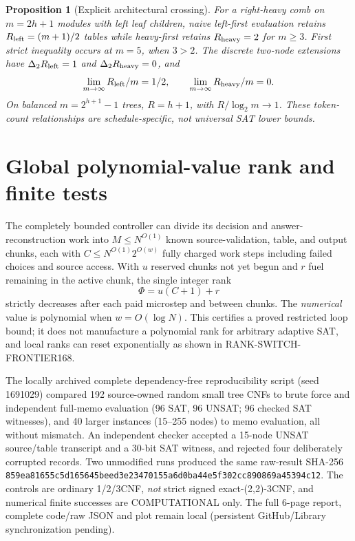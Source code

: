 \documentclass[11pt]{article}
\newtheorem{proposition}[theorem]{Proposition}
\begin{document}
\begin{proposition}[Explicit architectural crossing]
For a right-heavy comb on $m=2h+1$ modules with left leaf children, naive left-first evaluation retains $R_{\rm left}=(m+1)/2$ tables while heavy-first retains $R_{\rm heavy}=2$ for $m\ge3$. First strict inequality occurs at $m=5$, when $3>2$. The discrete two-node extensions have $\Delta_2 R_{\rm left}=1$ and $\Delta_2 R_{\rm heavy}=0$, and
\[
 \lim_{m\to\infty}R_{\rm left}/m=1/2,\qquad
 \lim_{m\to\infty}R_{\rm heavy}/m=0.
\]
On balanced $m=2^{h+1}-1$ trees, $R=h+1$, with $R/\log_2m\to1$. These token-count relationships are schedule-specific, not universal SAT lower bounds.
\end{proposition}

\section{Global polynomial-value rank and finite tests}
The completely bounded controller can divide its decision and answer-reconstruction work into $M\le N^{O(1)}$ known source-validation, table, and output chunks, each with $C\le N^{O(1)}2^{O(w)}$ fully charged work steps including failed choices and source access. With $u$ reserved chunks not yet begun and $r$ fuel remaining in the active chunk, the single integer rank
\[
 \Phi=u(C+1)+r
\]
strictly decreases after each paid microstep and between chunks. The \emph{numerical} value is polynomial when $w=O(\log N)$. This certifies a proved restricted loop bound; it does not manufacture a polynomial rank for arbitrary adaptive SAT, and local ranks can reset exponentially as shown in RANK-SWITCH-FRONTIER168.

The locally archived complete dependency-free reproducibility script (seed 1691029) compared 192 source-owned random small tree CNFs to brute force and independent full-memo evaluation (96 SAT, 96 UNSAT; 96 checked SAT witnesses), and 40 larger instances (15--255 nodes) to memo evaluation, all without mismatch. An independent checker accepted a 15-node UNSAT source/table transcript and a 30-bit SAT witness, and rejected four deliberately corrupted records. Two unmodified runs produced the same raw-result SHA-256
\texttt{859ea81655c5d165645beed3e23470155a6d0ba44e5f302cc890869a45394c12}.
The controls are ordinary 1/2/3CNF, \emph{not} strict signed exact-(2,2)-3CNF, and numerical finite successes are COMPUTATIONAL only. The full 6-page report, complete code/raw JSON and plot remain local (persistent GitHub/Library synchronization pending).
\end{document}
